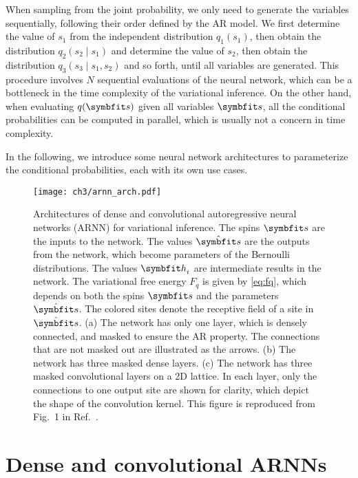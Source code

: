 When sampling from the joint probability, we only need to generate the variables sequentially, following their order defined by the AR model. We first determine the value of $s_1$ from the independent distribution $q_1(s_1)$, then obtain the distribution $q_2(s_2 \mid s_1)$ and determine the value of $s_2$, then obtain the distribution $q_3(s_3 \mid s_1, s_2)$ and so forth, until all variables are generated. This procedure involves $N$ sequential evaluations of the neural network, which can be a bottleneck in the time complexity of the variational inference. On the other hand, when evaluating $q(\vs)$ given all variables $\vs$, all the conditional probabilities can be computed in parallel, which is usually not a concern in time complexity.

In the following, we introduce some neural network architectures to parameterize the conditional probabilities, each with its own use cases.

\begin{figure}[htb]
\centering
\texttt{[image: ch3/arnn\_arch.pdf]}
\caption[Architectures of dense and convolutional autoregressive neural networks]{
Architectures of dense and convolutional autoregressive neural networks (ARNN) for variational inference.
The spins $\vs$ are the inputs to the network.
The values $\hat{\vs}$ are the outputs from the network, which become parameters of the Bernoulli distributions.
The values $\vh_i$ are intermediate results in the network.
The variational free energy $F_q$ is given by \cref{eq:fq}, which depends on both the spins $\vs$ and the parameters $\hat{\vs}$.
The colored sites denote the receptive field of a site in $\hat{\vs}$.
(a) The network has only one layer, which is densely connected, and masked to ensure the AR property. The connections that are not masked out are illustrated as the arrows.
(b) The network has three masked dense layers.
(c) The network has three masked convolutional layers on a 2D lattice. In each layer, only the connections to one output site are shown for clarity, which depict the shape of the convolution kernel.
This figure is reproduced from Fig.~1 in Ref.~\cite{wu2019solving}.
}
\label{fig:arnn-arch}
\end{figure}

\section{Dense and convolutional ARNNs}

